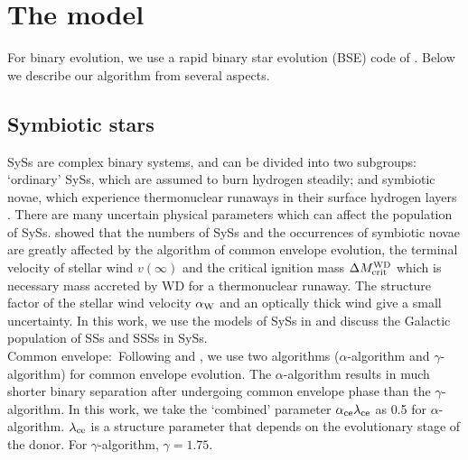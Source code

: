 \documentclass{elsart}
\begin{document}
\section{The model}
\label{mod} For binary evolution, we use a rapid binary star
evolution (BSE) code of \cite{h02}. Below we describe our algorithm
from several aspects.
\subsection{Symbiotic stars}
SySs are complex binary systems, and can be divided into two
subgroups: `ordinary' SySs, which are assumed to burn hydrogen
steadily; and symbiotic novae, which experience thermonuclear
runaways in their surface hydrogen layers \citep{ty76,m03}. There
are many uncertain physical parameters which can affect the
population of SySs. \citet{lu06} showed that the numbers of SySs and
the occurrences of symbiotic novae are greatly affected by the
algorithm of common envelope evolution, the terminal velocity of
stellar wind $v(\infty)$ and the critical ignition mass $\Delta
M_{\rm crit}^{\rm WD}$ which is necessary mass accreted by WD for a
thermonuclear runaway. The structure factor of the stellar wind
velocity $\alpha_{\rm W}$ and an optically thick wind give a small
uncertainty. In this work, we use the models of SySs in \citet{lu06}
and discuss the Galactic population of SSs and SSSs in SySs.\\

Common envelope:\ Following \cite{nt05} and \citet{lu06}, we use two
algorithms ($\alpha$-algorithm and $\gamma$-algorithm) for common
envelope evolution. The $\alpha$-algorithm results in much shorter
binary separation after undergoing common envelope phase than the
$\gamma$-algorithm. In this work, we take the `combined' parameter
$\alpha_{\rm ce}\lambda_{\rm ce}$ as 0.5 for $\alpha$-algorithm.
$\lambda_{\rm ce}$ is a structure parameter that depends on the
evolutionary stage of the donor. For $\gamma$-algorithm,
$\gamma=1.75$.
\end{document}
